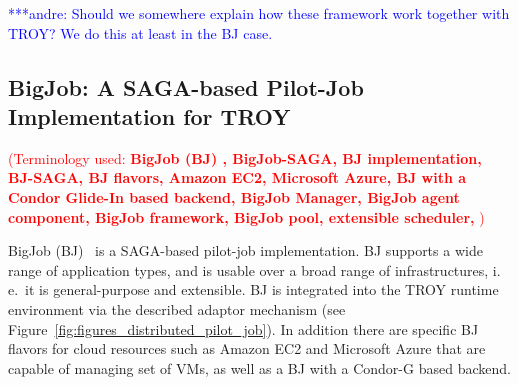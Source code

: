 \documentclass[conference,final]{IEEEtran}
\newcommand{\terminology}[1]{ {\textcolor{red} {(Terminology used: \textbf{#1}) }}}
\newcommand{\jhanote}[1]{ {\textcolor{red} { ***shantenu: #1 }}}
\newcommand{\alnote}[1]{ {\textcolor{blue} { ***andre: #1 }}}
\newcommand{\terminology}[1]{}
\newcommand{\alnote}[1]{}
\newcommand{\jhanote}[1]{}
\newcommand{\upp}{\vspace*{-0.5em}}
\begin{document}
\alnote{Should we somewhere explain how these framework work together with TROY? 
We do this at least in the BJ case.}

\subsection{BigJob: A SAGA-based Pilot-Job Implementation for
  TROY\upp\upp}
\terminology{BigJob (BJ) , BigJob-SAGA, BJ implementation,  BJ-SAGA, BJ flavors, Amazon EC2, Microsoft Azure,
 BJ with a Condor Glide-In based backend,  BigJob Manager, BigJob agent component, BigJob framework,
 BigJob pool, extensible scheduler, } 









BigJob (BJ)~\cite{bigjob_web,saga_bigjob_condor_cloud} is a SAGA-based pilot-job
implementation. BJ supports a wide range of application types, and is usable
over a broad range of infrastructures, i.\,e.\ it is general-purpose and
extensible. BJ is integrated into the TROY runtime environment via the described
adaptor mechanism (see Figure~\ref{fig:figures_distributed_pilot_job}). In
addition there are specific BJ flavors for cloud resources such as Amazon EC2
and Microsoft Azure that are capable of managing set of VMs, as well as a BJ
with a Condor-G based backend. 
\end{document}
